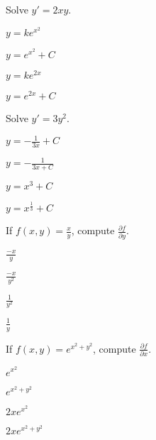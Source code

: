 \begin{readinessAssuranceTest}
\setcounter{enumi}{30}

\item Solve \(y'=2xy\).
\begin{multicols}{4}
\begin{readinessAssuranceTestChoices}
\item \(y=ke^{x^2}\) %
\item \(y=e^{x^2}+C\)
\item \(y=ke^{2x}\)
\item \(y=e^{2x}+C\)
\end{readinessAssuranceTestChoices}
\end{multicols}

\item Solve \(y'=3y^2\).
\begin{multicols}{4}
\begin{readinessAssuranceTestChoices}
\item \(y=-\frac{1}{3x}+C\) 
\item \(y=-\frac{1}{3x+C}\)%
\item \(y=x^3+C\)
\item \(y=x^\frac{1}{3}+C\)
\end{readinessAssuranceTestChoices}
\end{multicols}


\item If \(f(x,y) = \frac{x}{y}\), compute \(\frac{\partial f}{\partial y}\).
\begin{multicols}{4}
\begin{readinessAssuranceTestChoices}
\item \(\frac{-x}{y}\) 
\item \(\frac{-x}{y^2}\) %
\item \(\frac{1}{y^2}\) 
\item \(\frac{1}{y}\)
\end{readinessAssuranceTestChoices}
\end{multicols}

\item If \(f(x,y) = e^{x^2+y^2}\), compute \(\frac{\partial f}{\partial x}\).
\begin{multicols}{4}
\begin{readinessAssuranceTestChoices}
\item \(e^{x^2}\) 
\item \(e^{x^2+y^2}\) 
\item \(2xe^{x^2}\) 
\item \(2xe^{x^2+y^2}\)  %
\end{readinessAssuranceTestChoices}
\end{multicols}


\end{readinessAssuranceTest}
